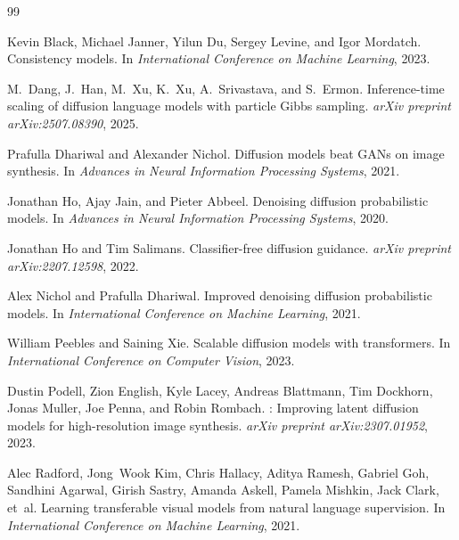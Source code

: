 \documentclass{article}
\begin{document}
\begin{thebibliography}{99}

Kevin Black, Michael Janner, Yilun Du, Sergey Levine, and Igor Mordatch.
\newblock Consistency models.
\newblock In \emph{International Conference on Machine Learning}, 2023.

M.~Dang, J.~Han, M.~Xu, K.~Xu, A.~Srivastava, and S.~Ermon.
\newblock Inference-time scaling of diffusion language models with particle Gibbs sampling.
\newblock \emph{arXiv preprint arXiv:2507.08390}, 2025.

Prafulla Dhariwal and Alexander Nichol.
\newblock Diffusion models beat GANs on image synthesis.
\newblock In \emph{Advances in Neural Information Processing Systems}, 2021.

Jonathan Ho, Ajay Jain, and Pieter Abbeel.
\newblock Denoising diffusion probabilistic models.
\newblock In \emph{Advances in Neural Information Processing Systems}, 2020.

Jonathan Ho and Tim Salimans.
\newblock Classifier-free diffusion guidance.
\newblock \emph{arXiv preprint arXiv:2207.12598}, 2022.

Alex Nichol and Prafulla Dhariwal.
\newblock Improved denoising diffusion probabilistic models.
\newblock In \emph{International Conference on Machine Learning}, 2021.

William Peebles and Saining Xie.
\newblock Scalable diffusion models with transformers.
\newblock In \emph{International Conference on Computer Vision}, 2023.

Dustin Podell, Zion English, Kyle Lacey, Andreas Blattmann, Tim Dockhorn, Jonas Muller, Joe Penna, and Robin Rombach.
: Improving latent diffusion models for high-resolution image synthesis.
\newblock \emph{arXiv preprint arXiv:2307.01952}, 2023.

Alec Radford, Jong~Wook Kim, Chris Hallacy, Aditya Ramesh, Gabriel Goh, Sandhini Agarwal, Girish Sastry, Amanda Askell, Pamela Mishkin, Jack Clark, et~al.
\newblock Learning transferable visual models from natural language supervision.
\newblock In \emph{International Conference on Machine Learning}, 2021.


\end{thebibliography}
\end{document}
